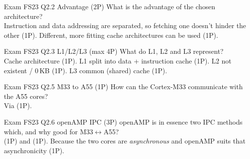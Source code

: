\begin{example2}{Exam FS23 Q2.2 Advantage (2P)}
    What is the advantage of the chosen architecture?
     \\ 
    Instruction and data addressing are separated, so fetching one doesn't hinder the other (1P). Different, more fitting cache architectures can be used (1P).
\end{example2}

\begin{example2}{Exam FS23 Q2.3 L1/L2/L3 (max 4P)}
    What do L1, L2 and L3 represent?
     \\ 
    Cache architecture (1P). L1 split into data + instruction cache (1P). L2 not existent / 0\,KB (1P). L3 common (shared) cache (1P).
\end{example2}

\begin{example2}{Exam FS23 Q2.5 M33 to A55 (1P)}
    How can the Cortex-M33 communicate with the A55 cores?
     \\ 
    Via  (1P).
\end{example2}

\begin{example2}{Exam FS23 Q2.6 openAMP IPC (3P)}
    openAMP is in essence two IPC methods which, and why good for M33$\leftrightarrow$A55?
     \\ 
     (1P) and  (1P). Because the two cores are \emph{asynchronous} and openAMP suits that asynchronicity (1P).
\end{example2}
